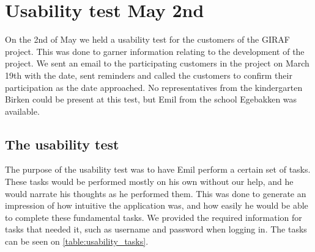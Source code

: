 \section{Usability test May 2nd}\label{usability-test-sprint-3}
On the 2nd of May we held a usability test for the customers of the GIRAF project.
This was done to garner information relating to the development of the project.
We sent an email to the participating customers in the project on March 19th with the date, sent reminders and called the customers to confirm their participation as the date approached.
No representatives from the kindergarten Birken could be present at this test, but Emil from the school Egebakken was available.

\subsection{The usability test}
The purpose of the usability test was to have Emil perform a certain set of tasks.
These tasks would be performed mostly on his own without our help, and he would narrate his thoughts as he performed them.
This was done to generate an impression of how intuitive the application was, and how easily he would be able to complete these fundamental tasks.
We provided the required information for tasks that needed it, such as username and password when logging in. 
The tasks can be seen on \autoref{table:usability_tasks}.
